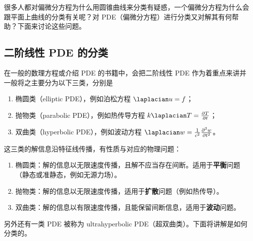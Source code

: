 很多人都对偏微分方程为什么用圆锥曲线来分类有疑惑，一个偏微分方程为什么会跟平面上曲线的分类有关呢？对 PDE（偏微分方程）进行分类又对解其有何帮助？下面来讨论这些问题。

\subsection{二阶线性 PDE 的分类}\label{sub_chacur_1}
在一般的数理方程或介绍 PDE 的书籍中，会把二阶线性 PDE 作为着重点来讲并一般将之主要分为以下三类，分别是
\begin{enumerate}
\item 椭圆类（elliptic PDE），例如泊松方程 $\laplacian u = f$；
\item 抛物类（parabolic PDE），例如热传导方程 $k \laplacian T = \frac{\partial T}{\partial t}$；
\item 双曲类（hyperbolic PDE），例如波动方程 $\laplacian w = \frac{1}{c^2} \frac{\partial^2 w}{\partial t^2}$。
\end{enumerate}
这三类的解信息沿特征线传播，有性质与对应的物理问题：
\begin{enumerate}
\item 椭圆类：解的信息以无限速度传播，且解不应当存在间断。适用于\textbf{平衡}问题（静态或准静态，例如无源力场）。
\item 抛物类：解的信息以无限速度传播，适用于\textbf{扩散}问题（例如热传导）。
\item 双曲类：解的信息以有限速度传播，且能保留间断信息，适用于\textbf{波动}问题。
\end{enumerate}
另外还有一类 PDE 被称为 ultrahyperbolic PDE（超双曲类）。下面将讲解是如何分类的。

